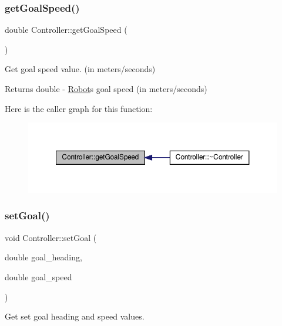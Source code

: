 \subsubsection{\texorpdfstring{get\+Goal\+Speed()}{getGoalSpeed()}}
{\footnotesize\ttfamily double Controller\+::get\+Goal\+Speed (\begin{DoxyParamCaption}{ }\end{DoxyParamCaption})}



Get goal speed value. (in meters/seconds) 

\begin{DoxyReturn}{Returns}
double -\/ \hyperlink{classRobot}{Robot}\textquotesingle{}s goal speed (in meters/seconds) 
\end{DoxyReturn}
Here is the caller graph for this function\+:
\nopagebreak
\begin{figure}[H]
\begin{center}
\leavevmode
\includegraphics[width=350pt]{classController_ab8161275786c47cc70d1ad82f3c476e2_icgraph}
\end{center}
\end{figure}
\mbox{\label{classController_ad41ca82c11e43a21d32c23ad159e747b}} 
\subsubsection{\texorpdfstring{set\+Goal()}{setGoal()}}
{\footnotesize\ttfamily void Controller\+::set\+Goal (\begin{DoxyParamCaption}\item[{double}]{goal\+\_\+heading,  }\item[{double}]{goal\+\_\+speed }\end{DoxyParamCaption})}



Get set goal heading and speed values. 


